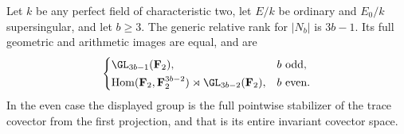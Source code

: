 \begin{theorem}
\label{thm:mixed-three-by-b-full-groups-candidate}
Let $k$ be any perfect field of characteristic two, let $E/k$
be ordinary and $E_0/k$ supersingular, and let $b\ge3$.
The generic relative rank for $|N_b|$ is $3b-1$. Its full
geometric and arithmetic images are equal, and are
\[
 \begin{cases}
  \GL_{3b-1}(\mathbf F_2),&b\text{ odd},\\[2pt]
  \operatorname{Hom}(\mathbf F_2,\mathbf F_2^{3b-2})
          \rtimes\GL_{3b-2}(\mathbf F_2),&b\text{ even}.
 \end{cases}
\]
In the even case the displayed group is the full pointwise
stabilizer of the trace covector from the first projection,
and that is its entire invariant covector space.
\end{theorem}
